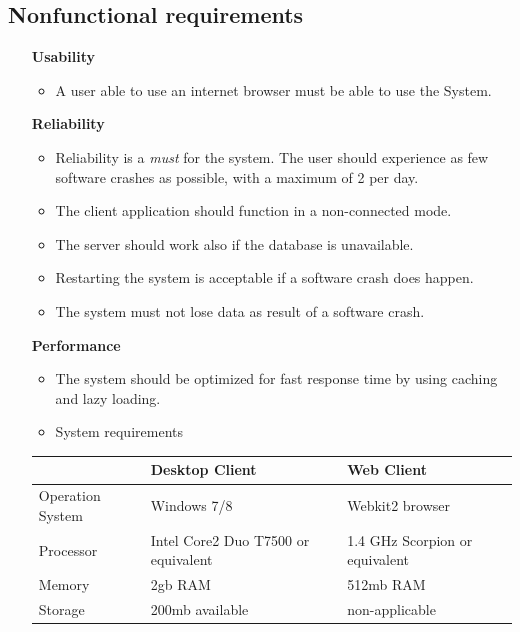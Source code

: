 \subsection{Nonfunctional requirements}

\begin{itemize}

\item[\textbf{Usability}]
\begin{itemize}
\item A user able to use an internet browser must be able to use the System.
\end{itemize}

\vspace{0.2cm}
\item[\textbf{Reliability}]
\begin{itemize}
\item Reliability is a \textit{must} for the system. The user should experience as few software crashes as possible, with a maximum of 2 per day.
\item The client application should function in a non-connected mode.
\item The server should work also if the database is unavailable.
\item Restarting the system is acceptable if a software crash does happen.
\item The system must not lose data as result of a software crash.
\end{itemize}


\vspace{0.2cm}
\item[\textbf{Performance}]

\hspace{50cm}

\begin{itemize}
\item The system should be optimized for fast response time by using caching and lazy loading.
\item System requirements
\end{itemize}


\begin{tabular}{|p{2cm}|p{5cm}|p{5cm}|}
\hline  & Desktop Client & Web Client \\ 
\hline Operation System & Windows 7/8 & Webkit2 browser \\
\hline Processor & Intel Core2 Duo T7500 or equivalent & 1.4 GHz Scorpion or equivalent \\ 
\hline Memory & 2gb RAM & 512mb RAM \\ 
\hline Storage & 200mb available & non-applicable \\ 
\hline 
\end{tabular} 


\end{itemize}
